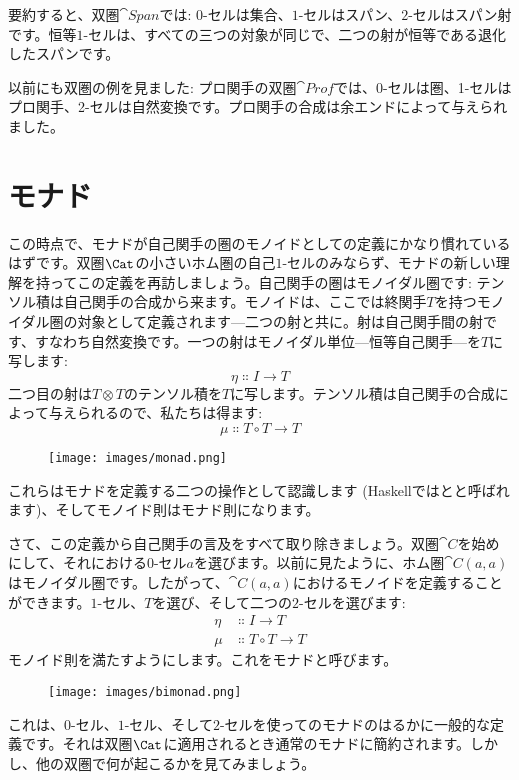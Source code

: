 \noindent
要約すると、双圏$\cat{Span}$では: $0$-セルは集合、$1$-セルはスパン、$2$-セルはスパン射です。恒等$1$-セルは、すべての三つの対象が同じで、二つの射が恒等である退化したスパンです。

以前にも双圏の例を見ました: プロ関手の双圏$\cat{Prof}$では、0-セルは圏、1-セルはプロ関手、2-セルは自然変換です。プロ関手の合成は余エンドによって与えられました。

\section{モナド}

この時点で、モナドが自己関手の圏のモノイドとしての定義にかなり慣れているはずです。双圏$\Cat$の小さいホム圏の自己$1$-セルのみならず、モナドの新しい理解を持ってこの定義を再訪しましょう。自己関手の圏はモノイダル圏です: テンソル積は自己関手の合成から来ます。モノイドは、ここでは終関手$T$を持つモノイダル圏の対象として定義されます—二つの射と共に。射は自己関手間の射です、すなわち自然変換です。一つの射はモノイダル単位—恒等自己関手—を$T$に写します: 
\[\eta \Colon I \to T\]
二つ目の射は$T \otimes T$のテンソル積を$T$に写します。テンソル積は自己関手の合成によって与えられるので、私たちは得ます: 
\[\mu \Colon T \circ T \to T\]

\begin{figure}[H]
  \centering
  \texttt{[image: images/monad.png]}
\end{figure}

\noindent
これらはモナドを定義する二つの操作として認識します (Haskellではとと呼ばれます)、そしてモノイド則はモナド則になります。

さて、この定義から自己関手の言及をすべて取り除きましょう。双圏$\cat{C}$を始めにして、それにおける$0$-セル$a$を選びます。以前に見たように、ホム圏$\cat{C}(a, a)$はモノイダル圏です。したがって、$\cat{C}(a, a)$におけるモノイドを定義することができます。$1$-セル、$T$を選び、そして二つの$2$-セルを選びます: 
\begin{align*}
  \eta & \Colon I \to T         \\
  \mu  & \Colon T \circ T \to T
\end{align*}
モノイド則を満たすようにします。これをモナドと呼びます。

\begin{figure}[H]
  \centering
  \texttt{[image: images/bimonad.png]}
\end{figure}

\noindent
これは、$0$-セル、$1$-セル、そして$2$-セルを使ってのモナドのはるかに一般的な定義です。それは双圏$\Cat$に適用されるとき通常のモナドに簡約されます。しかし、他の双圏で何が起こるかを見てみましょう。


